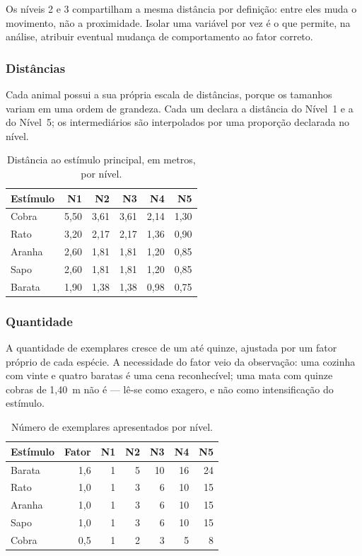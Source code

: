 Os níveis 2 e 3 compartilham a mesma distância por definição: entre eles
muda o movimento, não a proximidade. Isolar uma variável por vez é o que
permite, na análise, atribuir eventual mudança de comportamento ao fator
correto.

\subsubsection{Distâncias}

Cada animal possui a sua própria escala de distâncias, porque os tamanhos
variam em uma ordem de grandeza. Cada um declara a distância do Nível~1 e
a do Nível~5; os intermediários são interpolados por uma proporção
declarada no nível.

\begin{table}[htbp]
\centering
\caption{Distância ao estímulo principal, em metros, por nível.}
\label{tab:distancias}
\begin{tabular}{lrrrrr}
\toprule
\textbf{Estímulo} & \textbf{N1} & \textbf{N2} & \textbf{N3} & \textbf{N4} & \textbf{N5} \\
\midrule
Cobra  & 5,50 & 3,61 & 3,61 & 2,14 & 1,30 \\
Rato   & 3,20 & 2,17 & 2,17 & 1,36 & 0,90 \\
Aranha & 2,60 & 1,81 & 1,81 & 1,20 & 0,85 \\
Sapo   & 2,60 & 1,81 & 1,81 & 1,20 & 0,85 \\
Barata & 1,90 & 1,38 & 1,38 & 0,98 & 0,75 \\
\bottomrule
\end{tabular}
\end{table}

\subsubsection{Quantidade}

A quantidade de exemplares cresce de um até quinze, ajustada por um fator
próprio de cada espécie. A necessidade do fator veio da observação: uma
cozinha com vinte e quatro baratas é uma cena reconhecível; uma mata com
quinze cobras de 1,40~m não é --- lê-se como exagero, e não como
intensificação do estímulo.

\begin{table}[htbp]
\centering
\caption{Número de exemplares apresentados por nível.}
\label{tab:quantidades}
\begin{tabular}{lrrrrrr}
\toprule
\textbf{Estímulo} & \textbf{Fator} & \textbf{N1} & \textbf{N2} & \textbf{N3} & \textbf{N4} & \textbf{N5} \\
\midrule
Barata & 1,6 & 1 & 5 & 10 & 16 & 24 \\
Rato   & 1,0 & 1 & 3 & 6  & 10 & 15 \\
Aranha & 1,0 & 1 & 3 & 6  & 10 & 15 \\
Sapo   & 1,0 & 1 & 3 & 6  & 10 & 15 \\
Cobra  & 0,5 & 1 & 2 & 3  & 5  & 8  \\
\bottomrule
\end{tabular}
\end{table}


